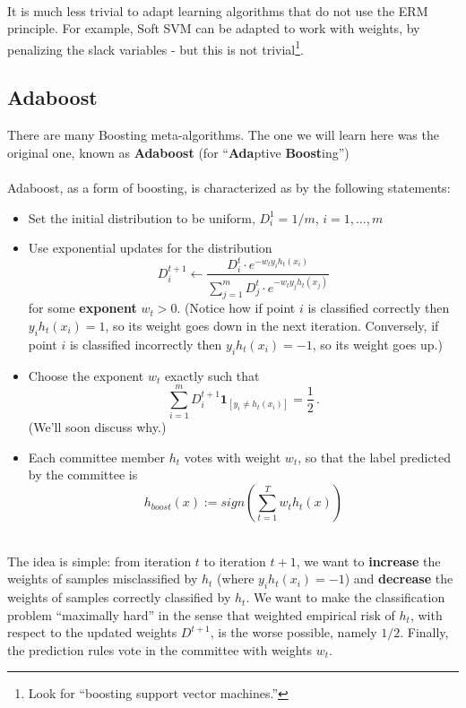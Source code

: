 ~\\
It is much less trivial to adapt learning algorithms that do not use the ERM
principle. For example, Soft SVM can be adapted to work with weights, 
by penalizing the slack
variables - but this is not trivial\footnote{Look for ``boosting support vector
machines.''}.



\subsection{Adaboost}

There are many Boosting meta-algorithms. The one we will learn here was the
original one, known as {\bf Adaboost} (for ``{\bf Ada}ptive {\bf Boost}ing'')
\\~\\
Adaboost, as a form of boosting, is characterized as by the following statements:
\begin{itemize}
  \item Set the initial distribution to be uniform, $D^1_i=1/m$, $i=1,\ldots,m$
  \item Use exponential updates for the distribution
    \[
      D^{t+1}_i \leftarrow \frac{D^t_i \cdot e^{-w_t y_i h_t(x_i)} }
      {\sum_{j=1}^m  D^t_j \cdot e^{-w_t y_j h_t(x_j)} }
    \]
    for some {\bf exponent} $w_t>0$. (Notice how if point  $i$ is classified
      correctly then $ y_i h_t(x_i)=1$,  so its weight goes down in the next
      iteration. Conversely, if point  $i$ is classified
    incorrectly then $ y_i h_t(x_i)=-1$,  so its weight goes up.)
  \item Choose the exponent $w_t$ exactly such that
    \[
      \sum_{i=1}^m D^{t+1}_i\mathbf{1}_{[y_i \neq h_t(x_i)]} = \frac{1}{2}\,.
    \]
    (We'll soon discuss why.)
  \item Each committee member $h_t$ votes with weight $w_t$, so that the
    label predicted by the committee is
    \[
      h_{boost}(x) := sign\left( \sum_{t=1}^T w_t h_t(x) \right)
    \]
\end{itemize}
~\\
The idea is simple: from iteration $t$ to iteration $t+1$, we want to {\bf
increase}
the weights of samples misclassified  by $h_t$ (where $y_i h_t(x_i)=-1$) and {\bf decrease}
the weights of samples correctly classified by $h_t$. We want to make the
classification problem ``maximally hard'' in the sense that weighted empirical
risk of $h_t$, with respect to the updated weights $D^{t+1}$, is the worse
possible, namely $1/2$.
Finally, the prediction rules vote in the committee with weights $w_t$.
